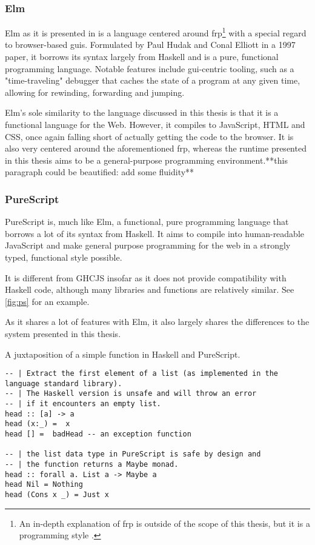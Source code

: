 \documentclass[oneside,11pt,xetex]{scrbook}
\begin{document}
\subsubsection{Elm}

Elm as it is presented in \parencite{CPL} is a language centered around
\gls{frp}\footnote{An in-depth explanation of \gls{frp} is outside of
the scope of this thesis, but it is a programming style \parencite{FRP}.}
with a special regard to browser-based \glspl{gui}. Formulated by Paul Hudak
and Conal Elliott in a 1997 paper, it borrows
its syntax largely from Haskell and is a pure, functional programming
language. Notable features include \gls{gui}-centric tooling, such
as a "time-traveling" debugger that caches the state of a program
at any given time, allowing for rewinding, forwarding and jumping.

Elm's sole similarity to the language discussed in this thesis is that it is
a functional language for the Web. However, it compiles to JavaScript, HTML
and CSS, once again falling short of actually getting the code to the
browser. It is also very centered around the aforementioned \gls{frp},
whereas the runtime presented in this thesis aims to be a general-purpose
programming environment.**this paragraph could be beautified: add some fluidity**

\subsubsection{PureScript}

PureScript is, much like Elm, a functional, pure programming language
that borrows a lot of its syntax from Haskell. It aims to compile into
human-readable JavaScript and make general purpose programming for the web
in a strongly typed, functional style possible.

It is different from GHCJS insofar as it does not provide compatibility
with Haskell code, although many libraries and functions are relatively
similar. See \ref{fig:ps} for an example.

As it shares a lot of features with Elm, it also largely shares the
differences to the system presented in this thesis.

\begin{listing}[H]
\caption{A juxtaposition of a simple function in Haskell and PureScript.}
\begin{verbatim}
-- | Extract the first element of a list (as implemented in the language standard library).
-- | The Haskell version is unsafe and will throw an error
-- | if it encounters an empty list.
head :: [a] -> a
head (x:_) =  x
head [] =  badHead -- an exception function

-- | the list data type in PureScript is safe by design and
-- | the function returns a Maybe monad.
head :: forall a. List a -> Maybe a
head Nil = Nothing
head (Cons x _) = Just x
\end{verbatim}
\end{listing}
\label{fig:ps}
\end{document}
